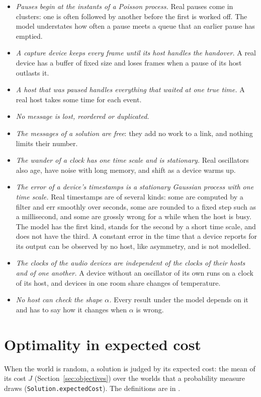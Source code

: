 \documentclass[11pt,a4paper]{article}
\newcommand{\lean}[1]{\texttt{#1}}
\theoremstyle{definition}
\begin{document}
\begin{itemize}
\item \emph{Pauses begin at the instants of a Poisson process.} Real pauses
  come in clusters: one is often followed by another before the first is
  worked off. The model understates how often a pause meets a queue that an
  earlier pause has emptied.
\item \emph{A capture device keeps every frame until its host handles the
  handover.} A real device has a buffer of fixed size and loses frames when
  a pause of its host outlasts it.
\item \emph{A host that was paused handles everything that waited at one
  true time.} A real host takes some time for each event.
\item \emph{No message is lost, reordered or duplicated.}
\item \emph{The messages of a solution are free}: they add no work to a
  link, and nothing limits their number.
\item \emph{The wander of a clock has one time scale and is stationary.}
  Real oscillators also age, have noise with long memory, and shift as a
  device warms up.
\item \emph{The error of a device's timestamps is a stationary Gaussian
  process with one time scale.} Real timestamps are of several kinds: some
  are computed by a filter and err smoothly over seconds, some are rounded
  to a fixed step such as a millisecond, and some are grossly wrong for a
  while when the host is busy. The model has the first kind, stands for the
  second by a short time scale, and does not have the third. A constant
  error in the time that a device reports for its output can be observed by
  no host, like asymmetry, and is not modelled.
\item \emph{The clocks of the audio devices are independent of the clocks of
  their hosts and of one another.} A device without an oscillator of its own
  runs on a clock of its host, and devices in one room share changes of
  temperature.
\item \emph{No host can check the shape $\alpha$.} Every result under the
  model depends on it and has to say how it changes when $\alpha$ is wrong.
\end{itemize}

\section{Optimality in expected cost}\label{sec:optimality}

When the world is random, a solution is judged by its expected cost: the
mean of its cost $J$ (Section~\ref{sec:objectives}) over the worlds that a
probability measure draws (\lean{Solution.\allowbreak expectedCost}). The
definitions are in .
\end{document}
